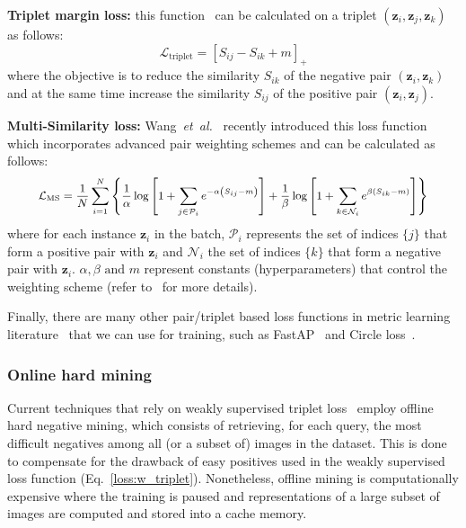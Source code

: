 \documentclass{article}
\newcommand{\etal}{\textit{et~al.}}
\begin{document}
\vspace{2pt}
\noindent\textbf{Triplet margin loss:} this function~\cite{hoffer2015deep} can be calculated on a triplet $\left(\mathbf{z}_i, \mathbf{z}_j, \mathbf{z}_k\right)$ as follows:
\begin{equation}
\mathcal{L}_{\text{triplet}} = \left[S_{ij} - S_{ik} + m \right]_{+}
\label{loss:triplet}
\end{equation}
where the objective is to reduce the similarity $S_{ik}$ of the negative pair $\left(\mathbf{z}_{i}, \mathbf{z}_{k}\right)$ and at the same time increase the similarity $S_{ij}$ of the positive pair  $\left(\mathbf{z}_{i}, \mathbf{z}_{j}\right)$.

\vspace{2pt}
\noindent \textbf{Multi-Similarity loss:} Wang~\etal~\cite{wang2019multi} recently introduced this loss function which incorporates advanced pair weighting schemes and can be calculated as follows:
\begin{equation}
\small
\begin{aligned}
\mathcal{L}_{\text{MS}} = \frac{1}{N} \sum_{i=1}^{N}  \left\{  \frac{1}{\alpha} \log \left[ 1 + \sum_{j \in \mathcal{P}_{i}} e^{- \alpha \left(S_{ij} - m \right)} \right]  +    \frac{1}{\beta}  \log \left[ 1+\sum_{k \in \mathcal{N}_{i}} e^{\beta \left(S_{ik} - m \right)} \right] \right\}
\end{aligned}
\label{loss:msloss}
\end{equation}
where for each instance $\mathbf{z}_i$ in the batch, $\mathcal{P}_{i}$ represents the set of indices $\{j\}$ that form a positive pair with $\mathbf{z}_i$ and $\mathcal{N}_{i}$ the set of indices $\{k\}$  that form a negative pair with $\mathbf{z}_i$. $\alpha, \beta \text{ and } m$ represent constants (hyperparameters) that control the weighting scheme (refer to~\cite{wang2019multi} for more details).

Finally, there are many other pair/triplet based loss functions in metric learning literature~\cite{musgrave2020pytorch, kaya2019deep} that we can use for training, such as FastAP~\cite{cakir2019deep} and Circle loss~\cite{sun2020circle}.



\subsubsection{Online hard mining}\label{sec:sampling}
Current techniques that rely on weakly supervised triplet loss~\cite{arandjelovic2016netvlad, kim2017learned, liu2019stochastic, warburg2020mapillary} employ offline hard negative mining, which consists of retrieving, for each query, the most difficult negatives among all (or a subset of) images in the dataset. This is done to compensate for the drawback of easy positives used in the weakly supervised loss function (Eq.~\ref{loss:w_triplet}). Nonetheless, offline mining is computationally expensive where the training is paused and representations of a large subset of images are computed and stored into a cache memory.
\end{document}

